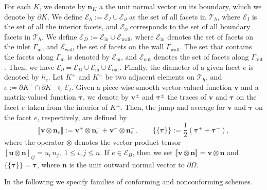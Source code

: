 \documentclass[onefignum,onetabnum,reqno,a4paper,final]{siamart250211}
\newcommand{\jump}[1]{\llbracket #1 \rrbracket}
\newcommand{\mean}[1]{\{\!\!\{#1\}\!\!\}}
\newcommand\bu{\boldsymbol{u}}
\newcommand\bv{\boldsymbol{v}}
\newcommand\bn{\boldsymbol{n}}
\newcommand\0{\mathbf{0}}
\newcommand\CE{\mathcal{E}}
\def\CT{{\mathcal T}}
\newcommand\btau{\boldsymbol{\tau}}
\newcommand\Gm{\Gamma_{\mathrm{m}}}
\newcommand\Gi{\Gamma_{\mathrm{in}}}
\newcommand\Go{\Gamma_{\mathrm{out}}}
\newcommand\Gw{\Gamma_{\mathrm{wall}}}
\numberwithin{figure}{section}
\numberwithin{table}{section}
\begin{document}
	For each $K$, we denote by $\bn_K$ a the unit normal vector on its boundary, which we denote by $\partial K$. We define $\CE_h:=\CE_I\cup\CE_\partial$ as the set of all facets in $\CT_h$, where $\CE_I$ is the set of all the interior facets, and $\CE_\partial$ corresponds to the set of all boundary facets in $\CT_h$. 	We define $\CE_{D}:=\CE_{\mathrm{in}}\cup\CE_{\mathrm{wall}}$, where $\CE_{\mathrm{in}}$ denotes the set of facets on the inlet $\Gi$, and $\CE_{\mathrm{wall}}$ the set of facets on the wall $\Gw$. The set that contains the facets along $\Gm$ is denoted by $\CE_{\mathrm{m}}$, and $\CE_{\mathrm{out}}$ denotes the set of facets along $\Go$. Then, we have $\CE_\partial=\CE_{D}\cup\CE_{\mathrm{m}}\cup\CE_{\mathrm{out}}$. Finally, the diameter of a given facet $e$ is denoted by $h_e$. 
 Let $K^+$ and $K^-$ be two adjacent elements on $\CT_h$, and $e:=\partial K^+ \cap \partial K^- \in \CE_I$. Given a piece-wise smooth vector-valued function $\bv$ and a matrix-valued function $\btau$, we denote by $\bv^{\pm}$ and $\btau^{\pm}$ the traces of $\bv$ and $\btau$ on the facet $e$ taken from the interior of $K^{\pm}$. Then, the jump and average for $\bv$ and $\btau$ on the facet $e$, respectively, are defined by
	\begin{equation*}
\jump{\bv\otimes\bn_e}:=\bv^+\otimes\bn_{e}^+ + \bv^-\otimes\bn_{e}^-,\qquad \mean{\btau}:=\frac{1}{2}\left(\btau^+ +\btau^- \right),
	\end{equation*}
	where the operator $\otimes$ denotes the vector product tensor $[\bu\otimes\bn]_{ij}=u_i\,n_j,\; 1\leq i,j\leq n$. 
	If $e\in \CE_B$, then we set $\jump{\bv\otimes\bn}=\bv\otimes\bn$ and $\mean{\btau}=\btau$, where $\bn$ is the unit outward normal vector to $\partial\Omega$.

    In the following we specify families of conforming and nonconforming schemes.
\end{document}

